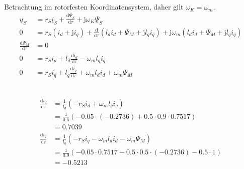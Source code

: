 \documentclass[11pt,a4paper]{scrartcl}
\newcommand{\mybr}[1]{\left(#1\right)}
\renewcommand{\j}{\mathrm{j}}
\renewcommand{\u}{\underline{u}}
\renewcommand{\i}{\underline{i}}
\newcommand{\PPsi}{\underline{\Psi}}
\newcommand{\0}{_{\mybr{0}}}
\newcommand{\1}{_{\mybr{1}}}
\newcommand{\2}{_{\mybr{2}}}
\renewcommand{\d}{\mathrm{d}}
\begin{document}
\section{}
\subsection{}
Betrachtung im rotorfesten Koordinatensystem, daher gilt $\omega_K=\omega_m$.
\begin{align}
\u_S&=r_S\i_S+\frac{\d\PPsi_S}{\d\tau}+\j\omega_K\PPsi_S\\
0&=r_S\mybr{i_d+\j i_q}+\frac{\d}{\d\tau}\mybr{l_d i_d + \Psi_M + \j l_q i_q}+\j \omega_m \mybr{l_d i_d + \Psi_M + \j l_q i_q}\\
\frac{\d\Psi_M}{\d\tau}&=0\\
0&=r_S i_d+l_d\frac{\d i_d}{\d\tau} -\omega_m l_q i_q\\
0&=r_S i_q+l_q\frac{\d i_q}{\d\tau}+\omega_m l_d i_d + \omega_m\Psi_M \\
\end{align}

\subsection{}
\begin{align}
\frac{\d i_d}{\d\tau}&=\frac{1}{l_d}\mybr{-r_S i_d+\omega_m l_q i_q}\\
&=\frac{1}{\num{0.5}}\mybr{\num{-0.05}\cdot\mybr{\num{-0.2736}}+\num{0.5}\cdot\num{0.9}\cdot\num{0.7517}}\\
&=\num{0.7039}\\
\frac{\d i_q}{\d\tau}&=\frac{1}{l_q}\mybr{-r_S i_q-\omega_m l_d i_d -\omega_m \Psi_M}\\
&=\frac{1}{\num{0.9}}\mybr{\num{-0.05}\cdot\num{0.7517}-\num{0.5}\cdot\num{0.5}\cdot\mybr{\num{-0.2736}}-\num{0.5}\cdot 1}\\
&=\num{-0.5213}
\end{align}
\end{document}
